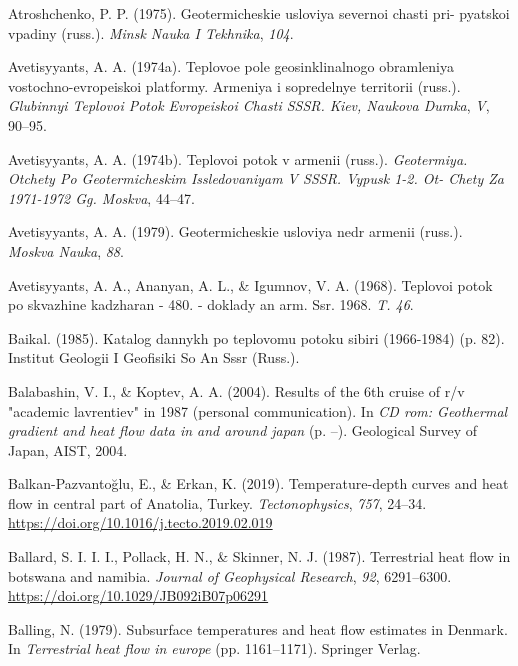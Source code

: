 \begin{CSLReferences}{1}{1}
\leavevmode{}%
Atroshchenko, P. P. (1975). Geotermicheskie usloviya severnoi chasti pri- pyatskoi vpadiny (russ.). \emph{Minsk Nauka I Tekhnika}, \emph{104}.

\leavevmode{}%
Avetisyyants, A. A. (1974a). Teplovoe pole geosinklinalnogo obramleniya vostochno-evropeiskoi platformy. Armeniya i sopredelnye territorii (russ.). \emph{Glubinnyi Teplovoi Potok Evropeiskoi Chasti SSSR. Kiev, Naukova Dumka}, \emph{V}, 90--95.

\leavevmode{}%
Avetisyyants, A. A. (1974b). Teplovoi potok v armenii (russ.). \emph{Geotermiya. Otchety Po Geotermicheskim Issledovaniyam V SSSR. Vypusk 1-2. Ot- Chety Za 1971-1972 Gg. Moskva}, 44--47.

\leavevmode{}%
Avetisyyants, A. A. (1979). Geotermicheskie usloviya nedr armenii (russ.). \emph{Moskva Nauka}, \emph{88}.

\leavevmode{}%
Avetisyyants, A. A., Ananyan, A. L., \& Igumnov, V. A. (1968). Teplovoi potok po skvazhine kadzharan - 480. - doklady an arm. Ssr. 1968. \emph{T. 46}.

\leavevmode{}%
Baikal. (1985). Katalog dannykh po teplovomu potoku sibiri (1966-1984) (p. 82). Institut Geologii I Geofisiki So An Sssr (Russ.).

\leavevmode{}%
Balabashin, V. I., \& Koptev, A. A. (2004). Results of the 6th cruise of r/v "academic lavrentiev" in 1987 (personal communication). In \emph{CD rom: Geothermal gradient and heat flow data in and around japan} (p. --). Geological Survey of Japan, AIST, 2004.

\leavevmode{}%
Balkan-Pazvantoğlu, E., \& Erkan, K. (2019). Temperature-depth curves and heat flow in central part of {Anatolia}, {Turkey}. \emph{Tectonophysics}, \emph{757}, 24--34. \url{https://doi.org/10.1016/j.tecto.2019.02.019}

\leavevmode{}%
Ballard, S. I. I. I., Pollack, H. N., \& Skinner, N. J. (1987). Terrestrial heat flow in botswana and namibia. \emph{Journal of Geophysical Research}, \emph{92}, 6291--6300. \url{https://doi.org/10.1029/JB092iB07p06291}

\leavevmode{}%
Balling, N. (1979). Subsurface temperatures and heat flow estimates in {Denmark}. In \emph{Terrestrial heat flow in europe} (pp. 1161--1171). Springer Verlag.


\end{CSLReferences}
